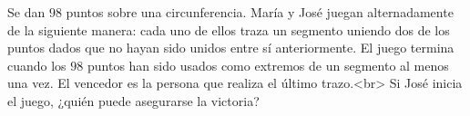 Se dan $98$ puntos sobre una circunferencia. María y José juegan alternadamente de la siguiente manera: cada uno de ellos traza un segmento uniendo dos de los puntos dados que no hayan sido unidos entre sí anteriormente. El juego termina cuando los $98$ puntos han sido usados como extremos de un segmento al menos una vez. El vencedor es la persona que realiza el último trazo.<br>
Si José inicia el juego, ¿quién puede asegurarse la victoria?
